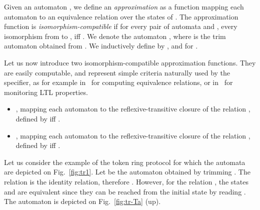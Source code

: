 \documentclass[]{llncs}
\begin{document}
Given an automaton , we define an {\it approximation} as a
function mapping each automaton  to an equivalence relation
 over the states of . The approximation function
 is {\it isomorphism-compatible} if for every pair of
automata  and , every isomorphism  from  to ,
 iff . We denote
 the automaton ,
where  is the trim automaton obtained from . We
inductively define  by , and
 for .



Let us now introduce two isomorphism-compatible approximation
functions. They are easily computable, and represent simple criteria
naturally used by the specifier, as for example 
in~\cite{bouajjani_abstract_2004} for computing equivalence relations, or 
in~\cite{DBLP:conf/fm/BauerF12} for monitoring LTL properties.
\begin{itemize}
\item , mapping each automaton  to the reflexive-transitive \linebreak[4]
closure of the relation ,
  defined by   iff .

\item , mapping each automaton  to the
  reflexive-transitive closure of the relation , defined by
   iff .




\end{itemize}

Let us consider the example of the token ring protocol for which the
automata are depicted on Fig.~\ref{fig:tr1}. Let  be the
automaton obtained by trimming . The relation  is the identity
relation, therefore . However, for the relation , the states
 and  are equivalent since they can be reached from the
initial state by reading . The automaton  is depicted on Fig.~\ref{fig:tr-Ta} (up).
\end{document}
